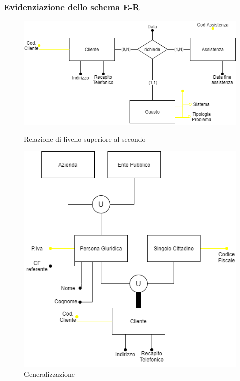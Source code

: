 \documentclass[legalpaper]{article}
\begin{document}
\subsubsection{Evidenziazione dello schema E-R}



\begin{figure}[!ht]
	\centering
	\begin{minipage}[b]{0.4\textwidth}
		\includegraphics[width=\linewidth]{../Parata/relazione_livello_superiore}
			\caption{Relazione di livello superiore al secondo}
		\label{fig:relazionelivellosuperiore}

	\end{minipage}
\hfill
	\begin{minipage}[b]{0.4\textwidth}
		\includegraphics[width=\linewidth]{../Parata/generalizzazione_diagram}
		\caption{Generalizzazione}
		\label{fig:generalizzazionediagram}
	\end{minipage}
\end{figure}
\end{document}
